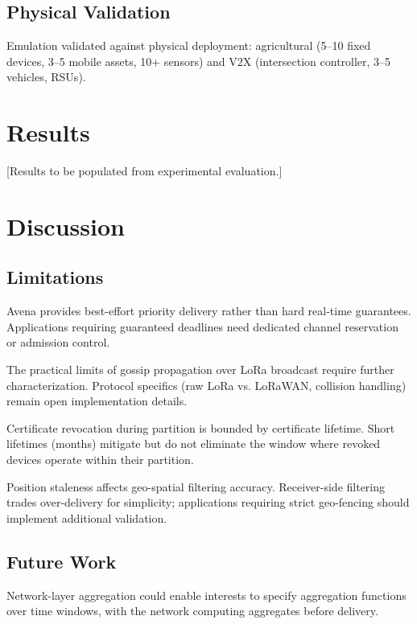 \documentclass[journal]{IEEEtran}
\begin{document}
\subsection{Physical Validation}

Emulation validated against physical deployment: agricultural (5--10 fixed devices, 3--5 mobile assets, 10+ sensors) and V2X (intersection controller, 3--5 vehicles, RSUs).


\section{Results}
\label{sec:results}

[Results to be populated from experimental evaluation.]


\section{Discussion}
\label{sec:discussion}

\subsection{Limitations}

Avena provides best-effort priority delivery rather than hard real-time guarantees. Applications requiring guaranteed deadlines need dedicated channel reservation or admission control.

The practical limits of gossip propagation over LoRa broadcast require further characterization. Protocol specifics (raw LoRa vs. LoRaWAN, collision handling) remain open implementation details.

Certificate revocation during partition is bounded by certificate lifetime. Short lifetimes (months) mitigate but do not eliminate the window where revoked devices operate within their partition.

Position staleness affects geo-spatial filtering accuracy. Receiver-side filtering trades over-delivery for simplicity; applications requiring strict geo-fencing should implement additional validation.

\subsection{Future Work}

Network-layer aggregation could enable interests to specify aggregation functions over time windows, with the network computing aggregates before delivery.
\end{document}
